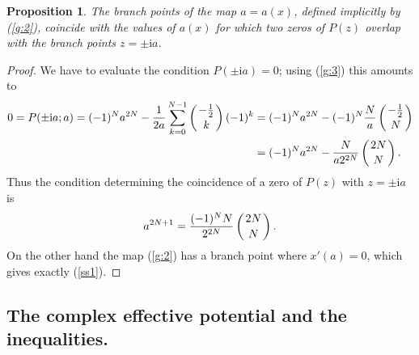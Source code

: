 \documentclass[10pt,reqno,oneside]{amsart}
\newcommand{\im}{\mathrm{i}}
\numberwithin{equation}{section}
\newtheorem{proposition}[theo]{Proposition}
\def\le{\left}
\def\ri{\right}
\def\bp{\begin{proposition}}
\def\ep{\end{proposition}}
\def\be{\begin{equation}}
\def\ee{\end{equation}}
\def\eqref#1{(\ref{#1})}
\def\binom#1#2{\le({#1 \atop #2}\ri)}
\begin{document}
\bp
\label{Propstarcorners}
The branch points of the map $a=a(x)$, defined implicitly by  \eqref{g:2}, coincide with the values of $a(x)$ for which two zeros of $P(z)$ overlap with the branch points $z = \pm\im a$.
\ep
\begin{proof}
We have to evaluate the condition $P(\pm\im a)=0$; using \eqref{g:3} this amounts to 
\begin{align*}
	0=P(\pm\im a;a) = (-1)^N a^{2N} - \frac 1 {2a} \sum_{k=0}^{N-1}\binom{-\frac{1}{2}}{k}(-1)^k&=(-1)^Na^{2N}-(-1)^N\frac{N}{a}\binom{-\frac{1}{2}}{N}\\
&=(-1)^Na^{2N}-\frac{N}{a2^{2N}}\binom{2N}{N}.
\end{align*}
Thus the condition determining the coincidence of a zero of $P(z)$ with $z=\pm\im a$ is 
\be
\label{ss1}
 a^{2N+1}=\frac{(-1)^N N}{  2^{2N}} \le({2N\atop N}\ri) .
\ee
On the other hand the map \eqref{g:2} has a branch point where $x'(a)=0$, which gives exactly \eqref{ss1}.
\end{proof}
\subsection{The complex effective potential and the inequalities.}
\end{document}
